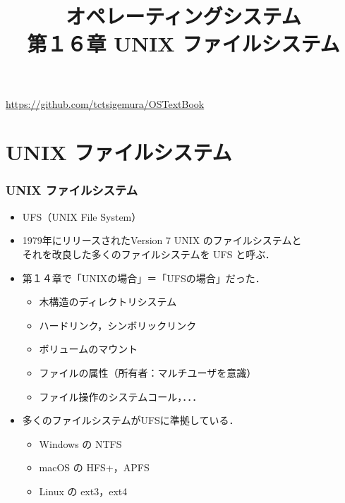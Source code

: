 \documentclass[unicode,handout]{beamer}                   %
\begin{document}
\title[UNIX ファイルシステム]
      {オペレーティングシステム\\第１６章 UNIX ファイルシステム}
\date{}
\begin{frame}
  \titlepage
  \centerline{\url{https://github.com/tctsigemura/OSTextBook}}
\end{frame}


\section{UNIX ファイルシステム}
\begin{frame}
  \frametitle{UNIX ファイルシステム}
  \begin{itemize}
  \item UFS（UNIX File System）
  \item 1979年にリリースされたVersion 7 UNIX のファイルシステムと \\
    それを改良した多くのファイルシステムを UFS と呼ぶ．
  \item 第１４章で「UNIXの場合」＝「UFSの場合」だった．
    \begin{itemize}
    \item 木構造のディレクトリシステム
    \item ハードリンク，シンボリックリンク
    \item ボリュームのマウント
    \item ファイルの属性（所有者：マルチユーザを意識）
    \item ファイル操作のシステムコール，．．．
    \end{itemize}
  \item 多くのファイルシステムがUFSに準拠している．
    \begin{itemize}
    \item Windows の NTFS
    \item macOS の HFS+，APFS
    \item Linux の ext3，ext4
    \end{itemize}
  \end{itemize}
  \vfill
\end{frame}
\end{document}
